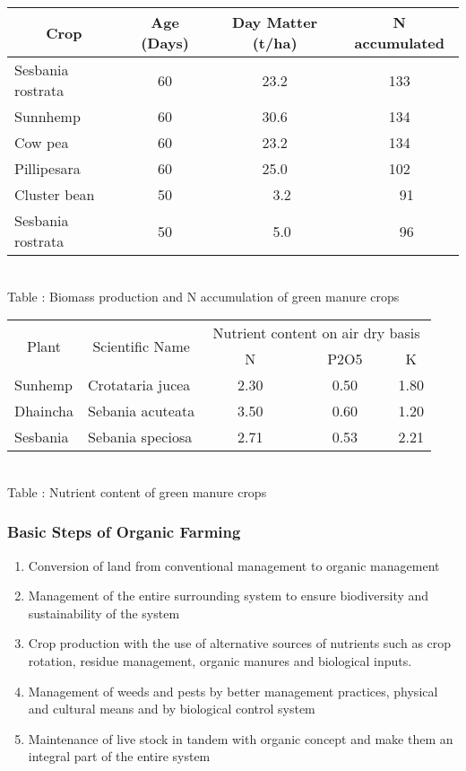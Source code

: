 \documentclass[12pt]{article}
\begin{document}
	\begin{center}
		\begin{tabular}{|l|c|c|c|} \hline
			\multicolumn{1}{|c|}{Crop} & Age (Days) & Day Matter (t/ha) & N accumulated \\ \hline
			Sesbania rostrata & 60 & 23.2 & 133 \\
			Sunnhemp & 60 & 30.6 & 134 \\
			Cow pea & 60 & 23.2 & 134 \\
			Pillipesara & 60 & 25.0 & 102 \\
			Cluster bean & 50 & ~~3.2 & ~~91 \\
			Sesbania rostrata & 50 & ~~5.0 & ~~96 \\ \hline
		\end{tabular} \\ \vspace{.5em} Table : Biomass production and N accumulation of green manure crops

		\vspace{2em}
		\begin{tabular}{|l|l|c|c|c|} \hline
			\multicolumn{1}{|c|}{\multirow{2}{*}{Plant}} & \multicolumn{1}{c|}{\multirow{2}{*}{Scientific Name}} & \multicolumn{3}{c|}{Nutrient content on air dry basis} \\ \cline{3-5}
			 & & ~~~~~N~~~~~ & ~~~P2O5~~~ & K \\ \hline
			Sunhemp & Crotataria jucea & 2.30 & 0.50 & 1.80 \\
			Dhaincha & Sebania acuteata & 3.50 & 0.60 & 1.20 \\
			Sesbania & Sebania speciosa & 2.71 & 0.53 & 2.21 \\ \hline
		\end{tabular} \\ \vspace{.5em} Table : Nutrient content of green manure crops
	\end{center}

	\subsubsection{Basic Steps of Organic Farming}
	\begin{enumerate}[label=\textbf{\arabic*.}]
		\item Conversion of land from conventional management to organic management
		\item Management of the entire surrounding system to ensure biodiversity and sustainability of the system
		\item Crop production with the use of alternative sources of nutrients such as crop rotation, residue management, organic manures and biological inputs.
		\item Management of weeds and pests by better management practices, physical and cultural means and by biological control system
		\item Maintenance of live stock in tandem with organic concept and make them an integral part of the entire system
	\end{enumerate}  \newpage
\end{document}

